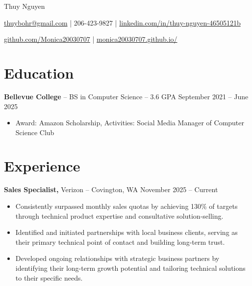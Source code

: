 \documentclass[11pt]{article}       %
\begin{document}
\centerline{\Huge Thuy Nguyen}

\vspace{5pt}

\centerline{\href{mailto:thuybohr@gmail.com}{thuybohr@gmail.com} | 206-423-9827 |
\href{https://www.linkedin.com/in/thuy-nguyen-46505121b/}{linkedin.com/in/thuy-nguyen-46505121b}}

\centerline{\href{https://github.com/Monica20030707}{github.com/Monica20030707} | 
\href{https://monica20030707.github.io/}{monica20030707.github.io/}} 

\vspace{-9pt}

\section*{Education}
\textbf{Bellevue College} -- BS in Computer Science -- 3.6 GPA \hfill September 2021 -- June 2025\\
\vspace{-9pt}
\begin{itemize}
  \item Award: Amazon Scholarship, Activities: Social Media Manager of Computer Science Club
\end{itemize}

\vspace{-18.5pt}

\section*{Experience}

\textbf{Sales Specialist,} {Verizon} -- Covington, WA \hfill November 2025 -- Current \\
\vspace{-9pt}
\begin{itemize}
  \item Consistently surpassed monthly sales quotas by achieving 130\% of targets through technical product expertise and consultative solution-selling.
  \item Identified and initiated partnerships with local business clients, serving as their primary technical point of contact and building long-term trust.
  \item Developed ongoing relationships with strategic business partners by identifying their long-term growth potential and tailoring technical solutions to their specific needs.
\end{itemize}
\end{document}
